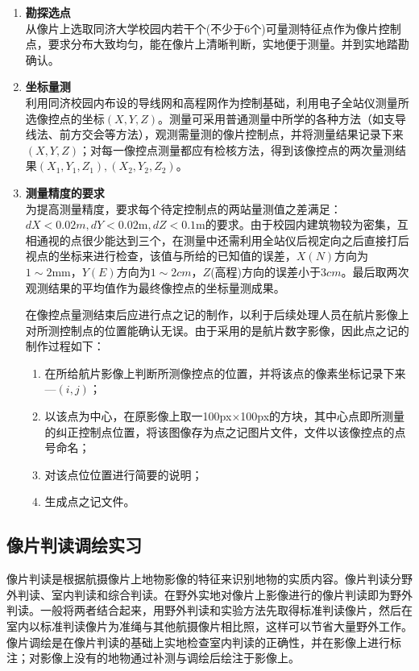 \begin{enumerate}
\item \textbf{勘探选点}\\
从像片上选取同济大学校园内若干个(不少于6个)可量测特征点作为像片控制点，要求分布大致均匀，能在像片上清晰判断，实地便于测量。并到实地踏勘确认。

\item \textbf{坐标量测}\\
利用同济校园内布设的导线网和高程网作为控制基础，利用电子全站仪测量所选像控点的坐标$(X,Y,Z)$。测量可采用普通测量中所学的各种方法（如支导线法、前方交会等方法），观测需量测的像片控制点，并将测量结果记录下来$(X,Y,Z)$；对每一像控点测量都应有检核方法，得到该像控点的两次量测结果$(X_1,Y_1,Z_1),(X_2,Y_2,Z_2)$。

\item \textbf{测量精度的要求}\\
为提高测量精度，要求每个待定控制点的两站量测值之差满足：$dX<0.02\si{m},
dY<0.02\si{\metre},dZ<0.1\si{\metre}$的要求。由于校园内建筑物较为密集，互相通视的点很少能达到三个，在测量中还需利用全站仪后视定向之后直接打后视点的坐标来进行检查，该值与所给的已知值的误差，$X(N)$方向为$1\sim 2\si{\milli\metre}$，$Y(E)$方向为$1\sim 2\si{cm}$，$Z$(高程)方向的误差小于$3\si{cm}$。最后取两次观测结果的平均值作为最终像控点的坐标量测成果。

在像控点量测结束后应进行点之记的制作，以利于后续处理人员在航片影像上对所测控制点的位置能确认无误。由于采用的是航片数字影像，因此点之记的制作过程如下：
\begin{enumerate}[label=\Alph*.]
\item 在所给航片影像上判断所测像控点的位置，并将该点的像素坐标记录下来---$(i,j)$；
\item 以该点为中心，在原影像上取一100px$\times$100px的方块，其中心点即所测量的纠正控制点位置，将该图像存为点之记图片文件，文件以该像控点的点号命名；
\item 对该点位位置进行简要的说明；
\item 生成点之记文件。
\end{enumerate}
\end{enumerate}

\subsection{像片判读调绘实习}

像片判读是根据航摄像片上地物影像的特征来识别地物的实质内容。像片判读分野外判读、室内判读和综合判读。在野外实地对像片上影像进行的像片判读即为野外判读。一般将两者结合起来，用野外判读和实验方法先取得标准判读像片，然后在室内以标准判读像片为准绳与其他航摄像片相比照，这样可以节省大量野外工作。像片调绘是在像片判读的基础上实地检查室内判读的正确性，并在影像上进行标注；对影像上没有的地物通过补测与调绘后绘注于影像上。

